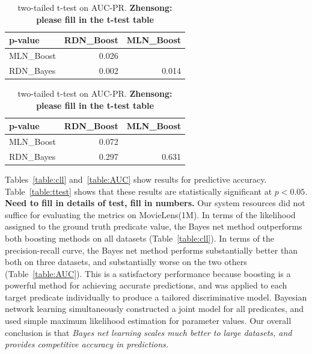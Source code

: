 \documentclass[runningheads,a4paper]{llncs}
\begin{document}
\begin{table}[!htb]
    \begin{minipage}{.5\linewidth}
      \caption{ two-tailed  t-test  on CLL}
      \centering
        \begin{tabular}{|l|r|r|} \hline
    \textbf{p-value} &RDN\_Boost   &MLN\_Boost    \\ \hline
    MLN\_Boost &0.026  &             \\
    RDN\_Bayes & 0.002 & 0.014  \\ \hline
    \end{tabular}%
  \label{table:ttestcll}%
    \end{minipage}%
    \begin{minipage}{.5\linewidth}
      \centering
        \caption{ two-tailed  t-test  on AUC-PR. \textbf{Zhensong: please fill in the t-test table}}
       \begin{tabular}{|l|r|r|} \hline
    \textbf{p-value} &RDN\_Boost   &MLN\_Boost    \\ \hline
    MLN\_Boost &0.072  &             \\
    RDN\_Bayes & 0.297 & 0.631  \\ \hline
    \end{tabular}%
  \label{table:ttestpr}%
    \end{minipage} 
\end{table} 
 
Tables~\ref{table:cll} and~\ref{table:AUC} show results for predictive accuracy. Table~\ref{table:ttest} shows that these results are statistically significant at $p < 0.05$. \textbf{Need to fill in details of test, fill in numbers.} Our system resources did not suffice for evaluating the metrics on MovieLens(1M).  In terms of the likelihood assigned to the ground truth predicate value, the Bayes net method outperforms both boosting methods on all datasets (Table~\ref{table:cll}). In terms of the precision-recall curve, the Bayes net method performs substantially better than both on three datasets, and substantially worse on the two others (Table~\ref{table:AUC}). This is a satisfactory performance because boosting is a powerful method for achieving accurate predictions, and was applied to each target predicate individually to produce a tailored discriminative model. Bayesian network learning simultaneously constructed a joint model for all predicates, and used simple maximum likelihood estimation for parameter values.
 Our overall conclusion is that \emph{Bayes net learning scales much better to large datasets, and provides competitive accuracy in predictions.} 
 
\end{document}
